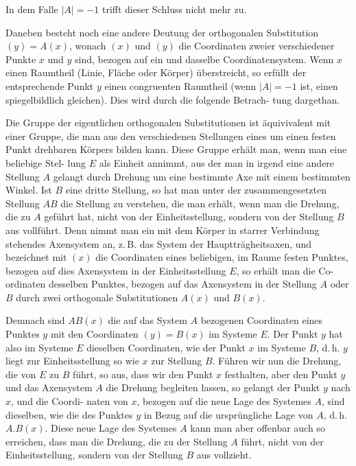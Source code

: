 \documentclass[12pt,a4paper]{article}
\theoremstyle{plain}
\theoremstyle{definition}
\theoremstyle{remark}
\begin{document}
In dem Falle $|A| = -1$ trifft dieser Schluss nicht mehr zu.

Daneben besteht noch eine andere Deutung der orthogonalen
Substitution $(y) = A(x)$, wonach $(x)$ und $(y)$ die Coordinaten
zweier verschiedener Punkte $x$ und $y$ sind, bezogen auf ein und
dasselbe Coordinatensystem. Wenn $x$ einen Raumtheil (Linie,
Fl\"ache oder K\"orper) \"uberstreicht, so erf\"ullt der entsprechende
Punkt $y$ einen congruenten Raumtheil (wenn $|A| = -1$ ist, einen
spiegelbildlich gleichen). Dies wird durch die folgende Betrach-
tung dargethan.

Die Gruppe der eigentlichen orthogonalen Substitutionen
ist \"aquivivalent mit einer Gruppe, die man aus den verschiedenen
Stellungen eines um einen festen Punkt drehbaren K\"orpers bilden
kann. Diese Gruppe erh\"alt man, wenn man eine beliebige Stel-
lung $E$ als Einheit annimmt, aus der man in irgend eine andere
Stellung $A$ gelangt durch Drehung um eine bestimmte Axe mit
einem bestimmten Winkel. Ist $B$ eine dritte Stellung, so hat
man unter der zusammengesetzten Stellung $AB$ die Stellung zu
verstehen, die man erh\"alt, wenn man die Drehung, die zu $A$
gef\"uhrt hat, nicht von der Einheitsstellung, sondern von der
Stellung $B$ aus vollf\"uhrt. Denn nimmt man ein mit dem K\"orper
in starrer Verbindung stehendes Axensystem an, z.\,B. das System
der Haupttr\"agheitsaxen, und bezeichnet mit $(x)$ die Coordinaten
eines beliebigen, im Raume festen Punktes, bezogen auf dies
Axensystem in der Einheitsstellung $E$, so erh\"alt man die Co-
ordinaten desselben Punktes, bezogen auf das Axensystem in der
Stellung $A$ oder $B$ durch zwei orthogonale Substitutionen $A(x)$
und $B(x)$.

Demnach sind $AB(x)$ die auf das System $A$ bezogenen
Coordinaten eines Punktes $y$ mit den Coordinaten $(y) = B(x)$
im Systeme $E$. Der Punkt $y$ hat also im Systeme $E$ dieselben
Coordinaten, wie der Punkt $x$ im Systeme $B$, d.\,h. $y$ liegt zur
Einheitsstellung so wie $x$ zur Stellung $B$. F\"uhren wir nun die
Drehung, die von $E$ zu $B$ f\"uhrt, so aus, dass wir den Punkt $x$
festhalten, aber den Punkt $y$ und das Axensystem $A$ die Drehung
begleiten lassen, so gelangt der Punkt $y$ nach $x$, und die Coordi-
naten von $x$, bezogen auf die neue Lage des Systemes $A$, sind
dieselben, wie die des Punktes $y$ in Bezug auf die urspr\"ungliche
Lage von $A$, d.\,h. $A.B(x)$. Diese neue Lage des Systemes $A$ kann
man aber offenbar auch so erreichen, dass man die Drehung,
die zu der Stellung $A$ f\"uhrt, nicht von der Einheitsstellung,
sondern von der Stellung $B$ aus vollzieht.
\end{document}
